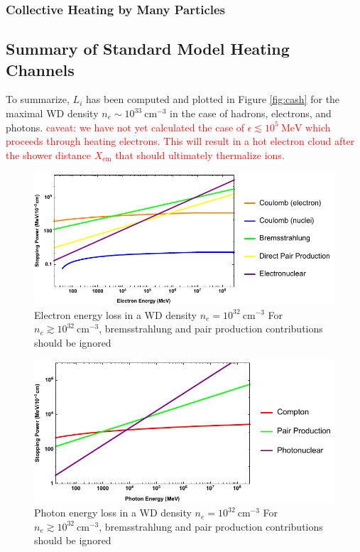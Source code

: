 \documentclass[twocolumn,showpacs,preprintnumbers,amsmath,amssymb,prd]{revtex4}
\begin{document}
\subsubsection{Collective Heating by Many Particles}

\subsection{Summary of Standard Model Heating Channels}

To summarize, $L_i$ has been computed and plotted in Figure \ref{fig:cash} for the maximal WD density $n_e \sim 10^{33} ~\text{cm}^{-3}$ in the case of hadrons, electrons, and photons.
\textcolor{red}{caveat: we have not yet calculated the case of $\epsilon \lesssim 10^{5} ~\text{MeV}$ which proceeds through heating electrons.
This will result in a hot electron cloud after the shower distance $X_\text{em}$ that should ultimately thermalize ions.}

\begin{figure}
\includegraphics[scale=.60]{SPelectron.pdf}
\caption{Electron energy loss in a WD density $n_e = 10^{32} ~\text{cm}^{-3}$ For $n_e \gtrsim 10^{32} ~\text{cm}^{-3}$, bremsstrahlung and pair production contributions should be ignored}
\label{fig:SPelectron}
\end{figure}

\begin{figure}
\includegraphics[scale=.60]{SPphoton.pdf}
\caption{Photon energy loss in a WD density $n_e = 10^{32} ~\text{cm}^{-3}$ For $n_e \gtrsim 10^{32} ~\text{cm}^{-3}$, bremsstrahlung and pair production contributions should be ignored}
\label{fig:SPphoton}
\end{figure}
\end{document}
